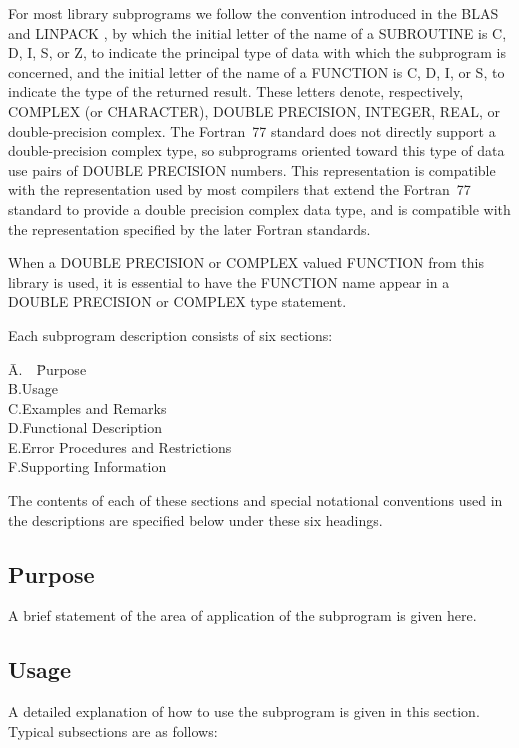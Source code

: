 \documentclass[twoside]{MATH77}
\begin{document}
For most library subprograms we follow the convention introduced in the
BLAS \cite{Lawson:1979:BLA} and LINPACK \cite{Dongarra:1979:LUG}, by
which the initial letter of the name of a SUBROUTINE is C, D, I, S, or Z,
to indicate the principal type of data with which the subprogram is
concerned, and the initial letter of the name of a FUNCTION is C, D, I, or
S, to indicate the type of the returned result.  These letters denote,
respectively, COMPLEX (or CHARACTER), DOUBLE PRECISION, INTEGER, REAL, or
double-precision complex.  The Fortran~77 standard does not directly
support a double-precision complex type, so subprograms oriented toward
this type of data use pairs of DOUBLE PRECISION numbers.  This
representation is compatible with the representation used by most
compilers that extend the Fortran~77 standard to provide a double
precision complex data type, and is compatible with the representation
specified by the later Fortran standards.

When a DOUBLE PRECISION or COMPLEX valued FUNCTION from this library is
used, it is essential to have the FUNCTION name appear in a DOUBLE PRECISION
or COMPLEX type statement.

Each subprogram description consists of six sections:
\begin{tabbing}
\hspace{.3in}\=A.\ \ \=Purpose\\
\>B.\>Usage\\
\>C.\>Examples and Remarks\\
\>D.\>Functional Description\\
\>E.\>Error Procedures and Restrictions\\
\>F.\>Supporting Information
\end{tabbing}

The contents of each of these sections and special notational conventions
used in the descriptions are specified below under these six headings.

\introalt
\subsection{Purpose}

A brief statement of the area of application of the subprogram is given here.

\subsection{Usage}

A detailed explanation of how to use the subprogram is given in this
section. Typical subsections are as follows:
\end{document}
